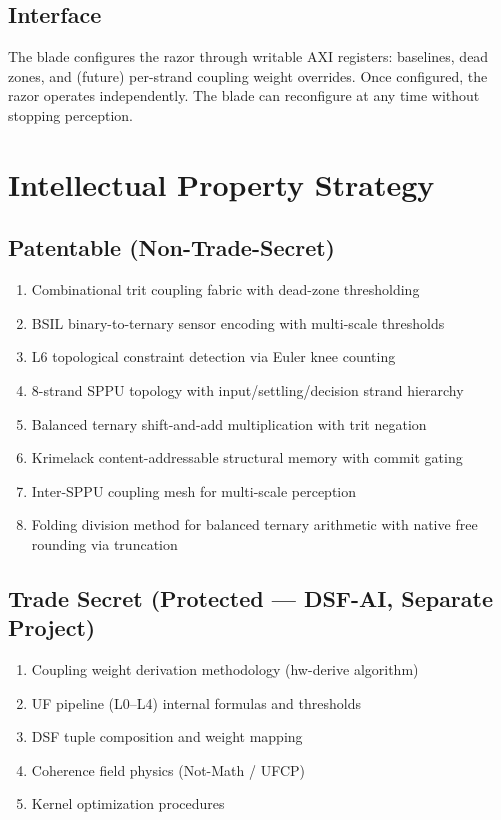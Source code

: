 \documentclass[11pt, a4paper]{article}
\begin{document}
\subsection{Interface}

The blade configures the razor through writable AXI registers:
baselines, dead zones, and (future) per-strand coupling weight
overrides. Once configured, the razor operates independently.
The blade can reconfigure at any time without stopping perception.

\section{Intellectual Property Strategy}

\subsection{Patentable (Non-Trade-Secret)}

\begin{enumerate}[nosep]
  \item Combinational trit coupling fabric with dead-zone thresholding
  \item BSIL binary-to-ternary sensor encoding with multi-scale thresholds
  \item L6 topological constraint detection via Euler knee counting
  \item 8-strand SPPU topology with input/settling/decision strand hierarchy
  \item Balanced ternary shift-and-add multiplication with trit negation
  \item Krimelack content-addressable structural memory with commit gating
  \item Inter-SPPU coupling mesh for multi-scale perception
  \item Folding division method for balanced ternary arithmetic with
        native free rounding via truncation
\end{enumerate}

\subsection{Trade Secret (Protected --- DSF-AI, Separate Project)}

\begin{enumerate}[nosep]
  \item Coupling weight derivation methodology (hw-derive algorithm)
  \item UF pipeline (L0--L4) internal formulas and thresholds
  \item DSF tuple composition and weight mapping
  \item Coherence field physics (Not-Math / UFCP)
  \item Kernel optimization procedures
\end{enumerate}
\end{document}
